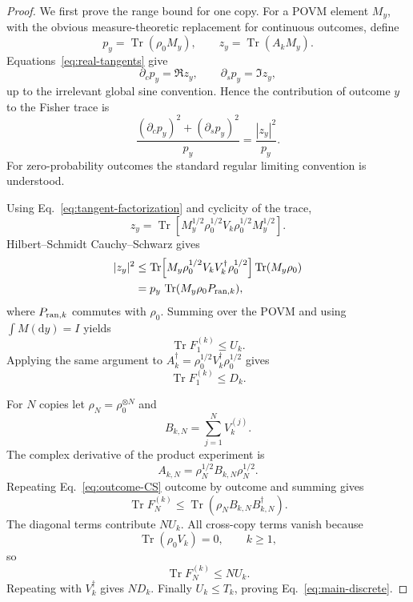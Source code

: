 \documentclass[aps,pra,reprint,amsmath,amssymb,longbibliography]{revtex4-2}
\newcommand{\Tr}{\operatorname{Tr}}
\newcommand{\dd}{\mathrm{d}}
\begin{document}
\begin{proof}
We first prove the range bound for one copy.  For a POVM element $M_y$, with the obvious measure-theoretic replacement for continuous outcomes, define
\begin{equation}
 p_y=\Tr(\rho_0M_y),
 \qquad
 z_y=\Tr(A_kM_y).
\end{equation}
Equations~\eqref{eq:real-tangents} give
\begin{equation}
 \partial_c p_y=\Re z_y,
 \qquad
 \partial_s p_y=\Im z_y,
\end{equation}
up to the irrelevant global sine convention.  Hence the contribution of outcome $y$ to the Fisher trace is
\begin{equation}
 \frac{(\partial_cp_y)^2+(\partial_sp_y)^2}{p_y}
 =\frac{|z_y|^2}{p_y}.
 \label{eq:FI-outcome}
\end{equation}
For zero-probability outcomes the standard regular limiting convention is understood.

Using Eq.~\eqref{eq:tangent-factorization} and cyclicity of the trace,
\begin{equation}
 z_y=\Tr\!\left[
 M_y^{1/2}\rho_0^{1/2}V_k\rho_0^{1/2}M_y^{1/2}
 \right].
\end{equation}
Hilbert--Schmidt Cauchy--Schwarz gives
\begin{align}
 |z_y|^2
 &\leq
 \Tr\!\left[M_y\rho_0^{1/2}V_kV_k^\dagger\rho_0^{1/2}\right]
 \Tr(M_y\rho_0)\\
 &=p_y\,\Tr(M_y\rho_0P_{{\rm ran},k}),
 \label{eq:outcome-CS}
\end{align}
where $P_{{\rm ran},k}$ commutes with $\rho_0$.  Summing over the POVM and using $\int M(\dd y)=I$ yields
\begin{equation}
 \Tr F_1^{(k)}\leq U_k.
 \label{eq:onecopy-U}
\end{equation}
Applying the same argument to $A_k^\dagger=\rho_0^{1/2}V_k^\dagger\rho_0^{1/2}$ gives
\begin{equation}
 \Tr F_1^{(k)}\leq D_k.
\end{equation}

For $N$ copies let $\rho_N=\rho_0^{\otimes N}$ and
\begin{equation}
 B_{k,N}=\sum_{j=1}^N V_k^{(j)}.
\end{equation}
The complex derivative of the product experiment is
\begin{equation}
 A_{k,N}=\rho_N^{1/2}B_{k,N}\rho_N^{1/2}.
\end{equation}
Repeating Eq.~\eqref{eq:outcome-CS} outcome by outcome and summing gives
\begin{equation}
 \Tr F_N^{(k)}
 \leq\Tr(\rho_N B_{k,N}B_{k,N}^\dagger).
 \label{eq:Ncopy-resource}
\end{equation}
The diagonal terms contribute $NU_k$.  All cross-copy terms vanish because
\begin{equation}
 \Tr(\rho_0V_k)=0,
 \qquad k\geq1,
\end{equation}
so
\begin{equation}
 \Tr F_N^{(k)}\leq NU_k.
\end{equation}
Repeating with $V_k^\dagger$ gives $ND_k$.  Finally $U_k\leq T_k$, proving Eq.~\eqref{eq:main-discrete}.
\end{proof}
\end{document}
